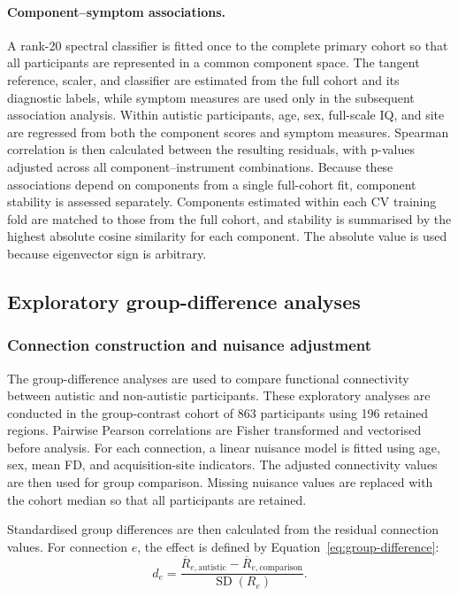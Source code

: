 \paragraph{\textbf{Component--symptom associations.}}
\label{par:component-symptom}
A rank-20 spectral classifier is fitted once to the complete primary cohort so that all participants are represented in a common component space. The tangent reference, scaler, and classifier are estimated from the full cohort and its diagnostic labels, while symptom measures are used only in the subsequent association analysis. Within autistic participants, age, sex, full-scale IQ, and site are regressed from both the component scores and symptom measures. Spearman correlation is then calculated between the resulting residuals, with p-values adjusted across all component--instrument combinations. Because these associations depend on components from a single full-cohort fit, component stability is assessed separately. Components estimated within each CV training fold are matched to those from the full cohort, and stability is summarised by the highest absolute cosine similarity for each component. The absolute value is used because eigenvector sign is arbitrary.

\subsection{Exploratory group-difference analyses}
\label{subsec:group-differences}

\subsubsection{Connection construction and nuisance adjustment}
\label{subsubsec:connection-adjustment}

The group-difference analyses are used to compare functional connectivity between autistic and non-autistic participants. These exploratory analyses are conducted in the group-contrast cohort of 863 participants using 196 retained regions. Pairwise Pearson correlations are Fisher transformed and vectorised before analysis. For each connection, a linear nuisance model is fitted using age, sex, mean FD, and acquisition-site indicators. The adjusted connectivity values are then used for group comparison. Missing nuisance values are replaced with the cohort median so that all participants are retained.


Standardised group differences are then calculated from the residual connection values.
For connection $e$, the effect is defined by Equation~\eqref{eq:group-difference}:
\begin{equation}
d_e
=
\frac{
\overline{R}_{e,\mathrm{autistic}}
-
\overline{R}_{e,\mathrm{comparison}}
}{
\operatorname{SD}(R_e)
}.
\label{eq:group-difference}
\end{equation}

